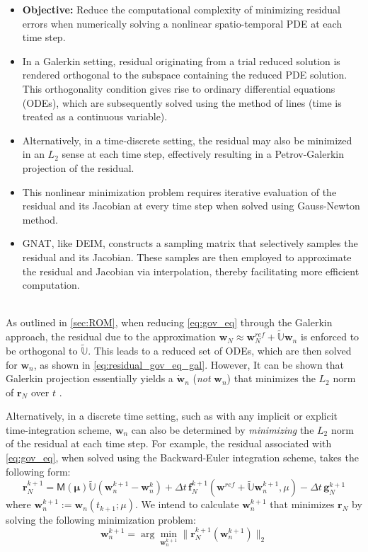 \documentclass[11pt]{article}
\renewcommand{\vec}[1]{\mathbf{#1}}
\newcommand{\mat}[1]{\mathsf{#1}}
\begin{document}
\noindent\hrulefill
\begin{itemize}
    \item {\bfseries Objective:} Reduce the computational complexity of minimizing residual errors when numerically solving a nonlinear spatio-temporal PDE at each time step.
    \item In a Galerkin setting, residual originating from a trial reduced solution is rendered orthogonal to the subspace containing the reduced PDE solution. This orthogonality condition gives rise to ordinary differential equations (ODEs), which are subsequently solved using the method of lines (time is treated as a continuous variable).
    \item Alternatively, in a time-discrete setting, the residual may also be minimized in an $L_2$ sense at each time step, effectively resulting in a Petrov-Galerkin projection of the residual. 
    \item This nonlinear minimization problem requires iterative evaluation of the residual and its Jacobian at every time step when solved using Gauss-Newton method. 
    \item GNAT, like DEIM, constructs a sampling matrix that selectively samples the residual and its Jacobian. These samples are then employed to approximate the residual and Jacobian via interpolation, thereby facilitating more efficient computation.
\end{itemize}
\noindent\hrulefill
\\
As outlined in \cref{sec:ROM}, when reducing \cref{eq:gov_eq} through the Galerkin approach, the residual due to the approximation $\vec{w}_N \approx \vec{w}^{ref}_N + \widetilde{\mathbb{U}}\vec{w}_n$ is enforced to be orthogonal to $\widetilde{\mathbb{U}}$.
This leads to a reduced set of ODEs, which are then solved for $\vec{w}_n$, as shown in \cref{eq:residual_gov_eq_gal}.
However, It can be shown that Galerkin projection essentially yields a $\dot{\vec{w}}_n$ (\textit{not} $\vec{w}_n$) that minimizes the $L_2$ norm of $\vec{r}_N$ over $t$ \cite{kim2022fasta}.


Alternatively, in a discrete time setting, such as with any implicit or explicit time-integration scheme, \(\vec{w}_n\) can also be determined by \textit{minimizing} the \(L_2\) norm of the residual at each time step. 
For example, the residual associated with \cref{eq:gov_eq}, when solved using the Backward-Euler integration scheme, takes the following form:
\begin{equation}
\vec{r}^{k+1}_{N} = \mat{M}(\boldsymbol{\mu})\widetilde{\mathbb{U}}\left(\vec{w}^{k+1}_n-\vec{w}^{k}_n\right) + \Delta t\,\vec{f}^{k+1}_N(\vec{w}^{ref} + \widetilde{\mathbb{U}}\vec{w}^{k+1}_n,\mu) -  \Delta t\,\vec{g}^{k+1}_N
\end{equation}
where $\vec{w}^{k+1}_n :=\vec{w}_n(t_{k+1};\mu)$.
We intend to calculate $\vec{w}^{k+1}_n$ that minimizes $\vec{r}_N$ by solving the following minimization problem:
\begin{equation}
\vec{w}^{k+1}_n = \arg\min_{\mathbf{w}^{k+1}_n} \|\mathbf{r}_N^{k+1}(\vec{w}^{k+1}_n)\|_2
\label{eq:res_min}
\end{equation}
\end{document}

